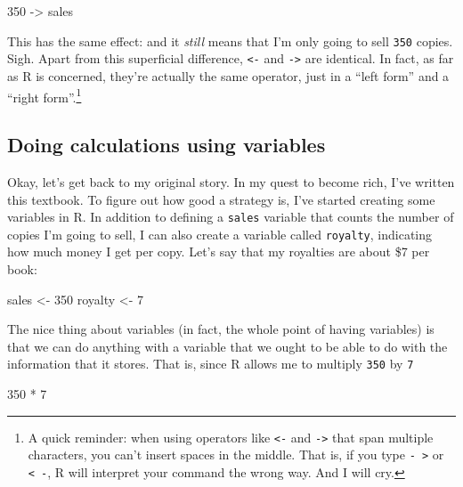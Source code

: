 \documentclass[
]{book}
\newenvironment{Shaded}{\begin{snugshade}}{\end{snugshade}}
\newcommand{\DecValTok}[1]{\textcolor[rgb]{0.00,0.00,0.81}{#1}}
\newcommand{\NormalTok}[1]{#1}
\newcommand{\OtherTok}[1]{\textcolor[rgb]{0.56,0.35,0.01}{#1}}
\newcommand{\SpecialCharTok}[1]{\textcolor[rgb]{0.00,0.00,0.00}{#1}}
\begin{document}
\begin{Shaded}
\begin{Highlighting}[]
\DecValTok{350} \OtherTok{{-}\textgreater{}}\NormalTok{ sales}
\end{Highlighting}
\end{Shaded}

This has the same effect: and it \emph{still} means that I'm only going to sell \texttt{350} copies. Sigh. Apart from this superficial difference, \texttt{\textless{}-} and \texttt{-\textgreater{}} are identical. In fact, as far as R is concerned, they're actually the same operator, just in a ``left form'' and a ``right form''.\footnote{A quick reminder: when using operators like \texttt{\textless{}-} and \texttt{-\textgreater{}} that span multiple characters, you can't insert spaces in the middle. That is, if you type \texttt{-\ \textgreater{}} or \texttt{\textless{}\ -}, R will interpret your command the wrong way. And I will cry.}

\hypertarget{doing-calculations-using-variables}{%
\subsection{Doing calculations using variables}\label{doing-calculations-using-variables}}

Okay, let's get back to my original story. In my quest to become rich, I've written this textbook. To figure out how good a strategy is, I've started creating some variables in R. In addition to defining a \texttt{sales} variable that counts the number of copies I'm going to sell, I can also create a variable called \texttt{royalty}, indicating how much money I get per copy. Let's say that my royalties are about \$7 per book:

\begin{Shaded}
\begin{Highlighting}[]
\NormalTok{sales }\OtherTok{\textless{}{-}} \DecValTok{350}
\NormalTok{royalty }\OtherTok{\textless{}{-}} \DecValTok{7}
\end{Highlighting}
\end{Shaded}

The nice thing about variables (in fact, the whole point of having variables) is that we can do anything with a variable that we ought to be able to do with the information that it stores. That is, since R allows me to multiply \texttt{350} by \texttt{7}

\begin{Shaded}
\begin{Highlighting}[]
\DecValTok{350} \SpecialCharTok{*} \DecValTok{7}
\end{Highlighting}
\end{Shaded}
\end{document}
